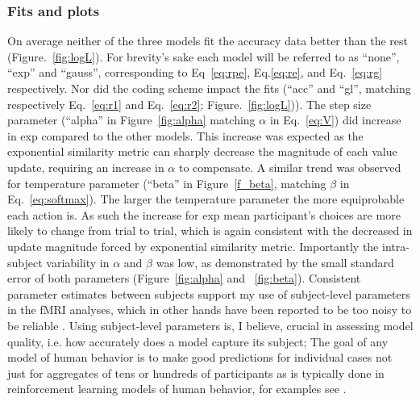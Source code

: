 \documentclass[doc,12pt]{apa}        %
\begin{document}
\subsubsection{Fits and plots}
\label{subsub:fits}
On average neither of the three models fit the accuracy data better than the rest (Figure.~\ref{fig:logL}).  For brevity's sake each model will be referred to as ``none'', ``exp'' and ``gauss'', corresponding to Eq~\ref{eq:rpe}, Eq.\ref{eq:re}, and Eq.~\ref{eq:rg} respectively.  Nor did the coding scheme impact the fits (``acc'' and ``gl'', matching respectively Eq.~\ref{eq:r1} and Eq.~\ref{eq:r2}; Figure.~\ref{fig:logL})).  The step size parameter (``alpha'' in Figure~\ref{fig:alpha} matching $\alpha$ in Eq.~\ref{eq:V}) did increase in exp compared to the other models.  This increase was expected as the exponential similarity metric can sharply decrease the magnitude of each value update, requiring an increase in $\alpha$ to compensate.  A similar trend was observed for temperature parameter (``beta'' in Figure~\ref{f_beta}, matching $\beta$ in Eq.~\ref{eq:softmax}).  The larger the temperature parameter the more equiprobable each action is.  As such the increase for exp mean participant's choices are more likely to change from trial to trial, which is again consistent with the decreased in update magnitude forced by exponential similarity metric.  Importantly the intra-subject variability in $\alpha$ and $\beta$ was low, as demonstrated by the small standard error of both parameters (Figure~\ref{fig:alpha} and ~\ref{fig:beta}).  Consistent parameter estimates between subjects support my use of subject-level parameters in the fMRI analyses, which in other hands have been reported to be too noisy to be reliable \cite{Daw:2011p7995,Seymour:2007p7585,ODoherty:2003p6329}.  Using subject-level parameters is, I believe, crucial in assessing model quality, i.e. how accurately does a model capture its subject; The goal of any model of human behavior is to make good predictions for individual cases not just for aggregates of tens or hundreds of participants \cite{Daw:2007p9346} as is typically done in reinforcement learning models of human behavior, for examples see .
\end{document}
